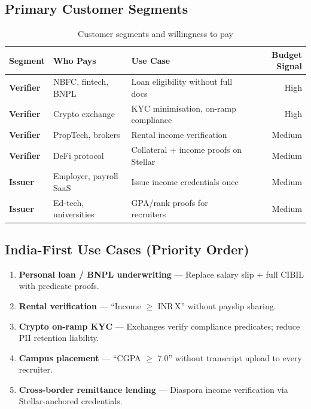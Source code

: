 \documentclass[11pt,a4paper]{article}
\newcommand{\stellar}{\textsf{Stellar}}
\begin{document}
\subsection{Primary Customer Segments}

\begin{table}[H]
  \centering
  \caption{Customer segments and willingness to pay}
  \renewcommand{\arraystretch}{1.25}
  \begin{tabularx}{\textwidth}{@{}>{\bfseries}p{2.5cm} p{3.5cm} X r@{}}
    \toprule
    Segment & Who Pays & Use Case & Budget Signal \\
    \midrule
    Verifier & NBFC, fintech, BNPL & Loan eligibility without full docs & High \\
    Verifier & Crypto exchange & KYC minimisation, on-ramp compliance & High \\
    Verifier & PropTech, brokers & Rental income verification & Medium \\
    Verifier & DeFi protocol & Collateral + income proofs on \stellar{} & Medium \\
    Issuer & Employer, payroll SaaS & Issue income credentials once & Medium \\
    Issuer & Ed-tech, universities & GPA/rank proofs for recruiters & Medium \\
    \bottomrule
  \end{tabularx}
\end{table}

\subsection{India-First Use Cases (Priority Order)}

\begin{enumerate}
  \item \textbf{Personal loan / BNPL underwriting} --- Replace salary slip + full CIBIL with predicate proofs.
  \item \textbf{Rental verification} --- ``Income $\geq$ INR\,X'' without payslip sharing.
  \item \textbf{Crypto on-ramp KYC} --- Exchanges verify compliance predicates; reduce PII retention liability.
  \item \textbf{Campus placement} --- ``CGPA $\geq$ 7.0'' without transcript upload to every recruiter.
  \item \textbf{Cross-border remittance lending} --- Diaspora income verification via \stellar{}-anchored credentials.
\end{enumerate}
\end{document}
